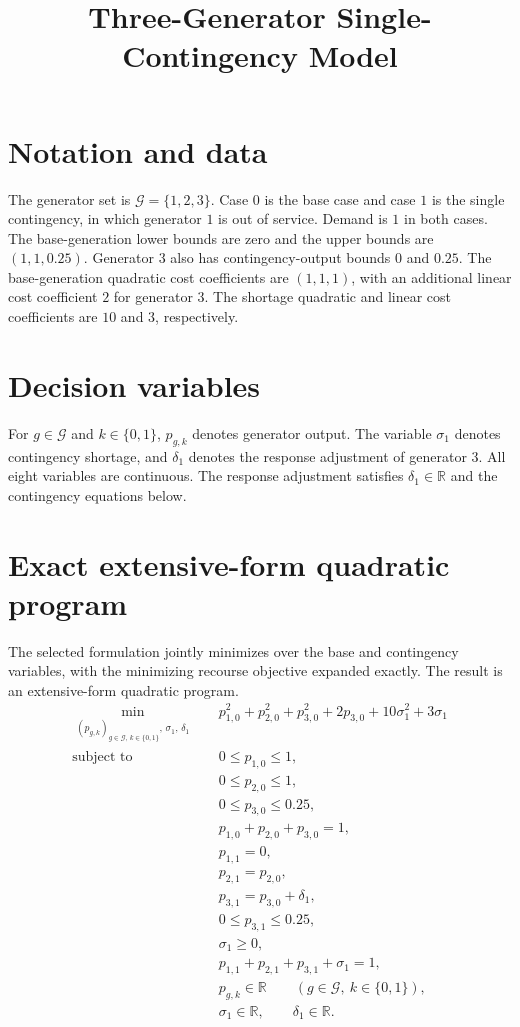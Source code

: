 \documentclass[11pt]{article}
\title{Three-Generator Single-Contingency Model}
\author{}
\date{}
\begin{document}
\maketitle

\section*{Notation and data}
The generator set is $\mathcal G=\{1,2,3\}$. Case $0$ is the base case and case $1$ is the single contingency, in which generator $1$ is out of service. Demand is $1$ in both cases. The base-generation lower bounds are zero and the upper bounds are $(1,1,0.25)$. Generator $3$ also has contingency-output bounds $0$ and $0.25$. The base-generation quadratic cost coefficients are $(1,1,1)$, with an additional linear cost coefficient $2$ for generator $3$. The shortage quadratic and linear cost coefficients are $10$ and $3$, respectively.

\section*{Decision variables}
For $g\in\mathcal G$ and $k\in\{0,1\}$, $p_{g,k}$ denotes generator output. The variable $\sigma_1$ denotes contingency shortage, and $\delta_1$ denotes the response adjustment of generator $3$. All eight variables are continuous. The response adjustment satisfies $\delta_1\in\mathbb R$ and the contingency equations below.

\section*{Exact extensive-form quadratic program}
The selected formulation jointly minimizes over the base and contingency variables, with the minimizing recourse objective expanded exactly. The result is an extensive-form quadratic program.
\begin{align}
\min_{\substack{(p_{g,k})_{g\in\mathcal G,\,k\in\{0,1\}},\,\sigma_1,\,\delta_1}}
\quad & p_{1,0}^{2}+p_{2,0}^{2}+p_{3,0}^{2}
       +2p_{3,0}+10\sigma_1^{2}+3\sigma_1
       \label{eq:objective}\\
\text{subject to}\quad
&0\le p_{1,0}\le 1,\\
&0\le p_{2,0}\le 1,\\
&0\le p_{3,0}\le 0.25,\\
&p_{1,0}+p_{2,0}+p_{3,0}=1,\\
&p_{1,1}=0,\\
&p_{2,1}=p_{2,0},\\
&p_{3,1}=p_{3,0}+\delta_1,\\
&0\le p_{3,1}\le 0.25,\\
&\sigma_1\ge 0,\\
&p_{1,1}+p_{2,1}+p_{3,1}+\sigma_1=1,\\
&p_{g,k}\in\mathbb R
  \qquad(g\in\mathcal G,\ k\in\{0,1\}),\\
&\sigma_1\in\mathbb R,\qquad \delta_1\in\mathbb R.
\end{align}
\end{document}
